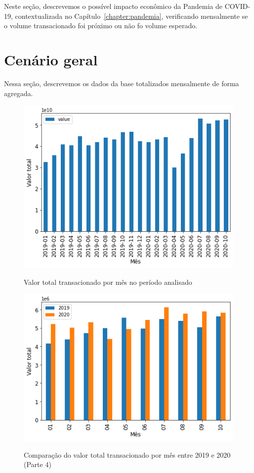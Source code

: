 
Neste seção, descrevemos o possível impacto econômico da Pandemia de COVID-19, contextualizada no Capítulo~\ref{chapter:pandemia}, verificando mensalmente se o volume transacionado foi próximo ou não fo volume esperado.

\section{Cenário geral}

Nessa seção, descrevemos os dados da base totalizados mensalmente de forma agregada.

\begin{figure}[htb]
	\centering
    \caption{Valor total transacionado por mês no período analisado}
    \includegraphics[scale=0.7]{images/base-de-dados-18.1-valor-mensal-total.png}
    \label{fig:pandemia:descritiva-18.1-valor-mensal-total}
    \fdadospesquisa
\end{figure}

\begin{figure}[htb]
	\centering
    \caption{Comparação do valor total transacionado por mês entre 2019 e 2020 (Parte 4)}
    \includegraphics[scale=0.7]{images/base-de-dados-19.1-comparacao-valor-mensal-total.png}
    \label{fig:pandemia:descritiva-19.1-comparacao-valor-mensal-total}
    \fdadospesquisa
\end{figure}

